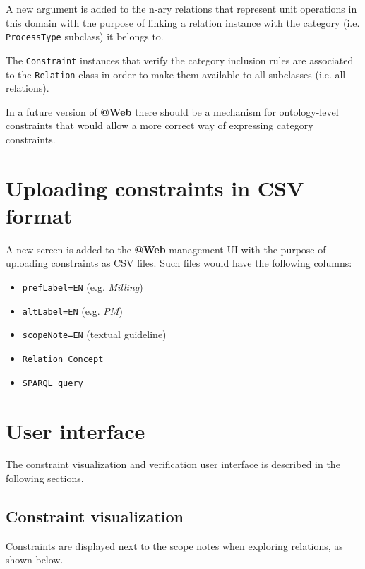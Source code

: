 \documentclass[a4paper, 10pt]{article}
\makeatletter
\newcommand{\atweb}{\textbf{@Web}\xspace}
\newcommand{\code}[1]{\texttt{#1}}
\makeatother
\begin{document}
A new argument is added to the n-ary relations that represent unit operations
in this domain with the purpose of linking a relation instance with the
category (i.e. \code{ProcessType} subclass) it belongs to.

The \code{Constraint} instances that verify the category inclusion rules are
associated to the \code{Relation} class in order to make them available to all
subclasses (i.e. all relations).

In a future version of \atweb there should be a mechanism for ontology-level
constraints that would allow a more correct way of expressing category
constraints.


\section{Uploading constraints in CSV format}

A new screen is added to the \atweb management UI with the purpose of uploading
constraints as CSV files. Such files would have the following columns:

\begin{itemize}
  \item \code{prefLabel=EN} (e.g. \textit{Milling})
  \item \code{altLabel=EN} (e.g. \textit{PM})
  \item \code{scopeNote=EN} (textual guideline)
  \item \code{Relation\_Concept}
  \item \code{SPARQL\_query}
\end{itemize}


\section{User interface}

The constraint visualization and verification user interface is described in
the following sections.

\subsection{Constraint visualization}

Constraints are displayed next to the scope notes when exploring relations, as
shown below.
\end{document}
